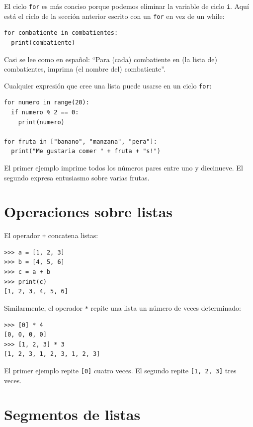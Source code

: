 El ciclo \texttt{for} es más conciso porque podemos eliminar la variable
de ciclo \texttt{i}. Aquí está el ciclo de la sección anterior escrito
con un \texttt{for} en vez de un while: 
\begin{verbatim}
for combatiente in combatientes:
  print(combatiente)
\end{verbatim}

Casi se lee como en español: ``Para (cada) combatiente en (la lista
de) combatientes, imprima (el nombre del) combatiente''.

Cualquier expresión que cree una lista puede usarse en un ciclo \texttt{for}:
\begin{verbatim}
for numero in range(20):
  if numero % 2 == 0:
    print(numero)

for fruta in ["banano", "manzana", "pera"]:
  print("Me gustaria comer " + fruta + "s!")
\end{verbatim}

El primer ejemplo imprime todos los números pares entre uno y diecinueve.
El segundo expresa entusiasmo sobre varias frutas.

\section{Operaciones sobre listas}

 

El operador \texttt{+} concatena listas:

\begin{verbatim}
>>> a = [1, 2, 3]
>>> b = [4, 5, 6]
>>> c = a + b
>>> print(c)
[1, 2, 3, 4, 5, 6]
\end{verbatim}

Similarmente, el operador \texttt{{*}} repite una lista un número
de veces determinado:

\begin{verbatim}
>>> [0] * 4
[0, 0, 0, 0]
>>> [1, 2, 3] * 3
[1, 2, 3, 1, 2, 3, 1, 2, 3]
\end{verbatim}

El primer ejemplo repite \texttt{{[}0{]}} cuatro veces. El segundo
repite \texttt{{[}1, 2, 3{]}} tres veces.

\section{Segmentos de listas}

